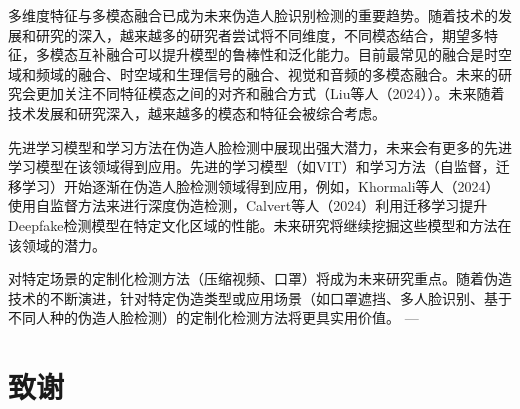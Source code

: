 \documentclass[conference]{IEEEtran}
\begin{document}
多维度特征与多模态融合已成为未来伪造人脸识别检测的重要趋势。随着技术的发展和研究的深入，越来越多的研究者尝试将不同维度，不同模态结合，期望多特征，多模态互补融合可以提升模型的鲁棒性和泛化能力。目前最常见的融合是时空域和频域的融合、时空域和生理信号的融合、视觉和音频的多模态融合。未来的研究会更加关注不同特征模态之间的对齐和融合方式（Liu等人（2024））。未来随着技术发展和研究深入，越来越多的模态和特征会被综合考虑。

先进学习模型和学习方法在伪造人脸检测中展现出强大潜力，未来会有更多的先进学习模型在该领域得到应用。先进的学习模型（如VIT）和学习方法（自监督，迁移学习）开始逐渐在伪造人脸检测领域得到应用，例如，Khormali等人（2024）使用自监督方法来进行深度伪造检测\cite{KhormaliYuan-366}，Calvert等人（2024）利用迁移学习提升Deepfake检测模型在特定文化区域的性能\cite{CalvertNg-350}。未来研究将继续挖掘这些模型和方法在该领域的潜力。

对特定场景的定制化检测方法（压缩视频、口罩）将成为未来研究重点。随着伪造技术的不断演进，针对特定伪造类型或应用场景（如口罩遮挡、多人脸识别、基于不同人种的伪造人脸检测）的定制化检测方法将更具实用价值。
---

\section*{致谢}



\end{document}
